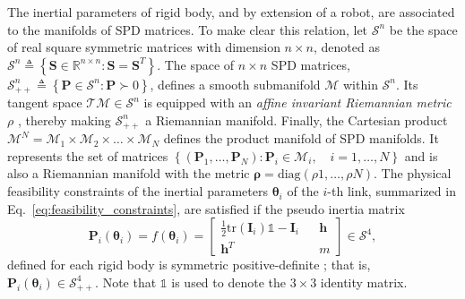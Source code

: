 The inertial parameters of rigid body, and by extension of a robot, are associated to the manifolds of SPD matrices. To make clear this relation, let $\mathcal{S}^n$ be the space of real square symmetric matrices with dimension $n \times n$, denoted as $\mathcal{S}^n \triangleq\left\lbrace \bm{S} \in \mathbb{R}^{n \times n} : \bm{S} = \bm{S}^T\right\rbrace$. The space of $n \times n$ SPD matrices, $\mathcal{S}^n_{++}\triangleq \left\lbrace \bm{P}\in \mathcal{S}^n : \bm{P} \succ 0 \right\rbrace$, defines a smooth submanifold $\mathcal{M}$ within $\mathcal{S}^n$. Its tangent space $\mathcal{T}\mathcal{M} \in \mathcal{S}^n$ is equipped with an \emph{affine invariant Riemannian metric} $\rho$ \cite{Lee2018geometricalgorithmrobust}, thereby making $ \mathcal{S}^n_{++} $ a Riemannian manifold. Finally, the Cartesian product $\mathcal{M}^N =\mathcal{M}_1\times \mathcal{M}_2\times \ldots \times \mathcal{M}_N$ defines the product manifold of SPD manifolds.  It represents the set of matrices $\left\lbrace \left(\bm{P}_1,\ldots,\bm{P}_N\right):\bm{P}_i\in\mathcal{M}_i,\quad i=1,\ldots,N\right\rbrace$ and is also a Riemannian manifold with the metric $ \bm{\rho} =\text{diag}\left( \rho{1},\ldots, \rho{N} \right) $. The physical feasibility constraints of the inertial parameters $\bm{\theta}_i$ of the $i$-th link, summarized in Eq.~\eqref{eq:feasibility_constraints}, are satisfied if the pseudo inertia matrix 
\begin{equation}\label{eq:pseudo_inertia_matrix}
	\bm{P}_i(\bm{\theta}_i)=f(\bm{\theta}_i)=\begin{bmatrix}
		\frac{1}{2}\text{tr}(\bm{I}_i)\mathbb{1} - \bm{I}_i && \bm{h} \\ \bm{h}^T && m
	\end{bmatrix} \in \mathcal{S}^4,
\end{equation}
defined for each rigid body is symmetric positive-definite \cite{Wensing2017Linearmatrixinequalities}; that is, $\bm{P}_i(\bm{\theta}_i)\in \mathcal{S}_{++}^4$. Note that $\mathbb{1}$ is used to denote the $3 \times 3$ identity matrix. %

